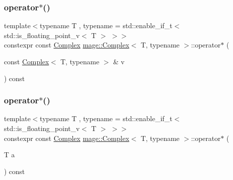 \subsubsection{\texorpdfstring{operator$\ast$()}{operator*()}\hspace{0.1cm}{\footnotesize\ttfamily [1/2]}}
{\footnotesize\ttfamily template$<$typename T , typename  = std\+::enable\+\_\+if\+\_\+t$<$ std\+::is\+\_\+floating\+\_\+point\+\_\+v$<$ T $>$ $>$$>$ \\
constexpr const \mbox{\hyperlink{structmage_1_1_complex}{Complex}} \mbox{\hyperlink{structmage_1_1_complex}{mage\+::\+Complex}}$<$ T, typename $>$\+::operator$\ast$ (\begin{DoxyParamCaption}\item[{const \mbox{\hyperlink{structmage_1_1_complex}{Complex}}$<$ T, typename $>$ \&}]{v }\end{DoxyParamCaption}) const\hspace{0.3cm}{\ttfamily [noexcept]}}

\mbox{\label{structmage_1_1_complex_a2165764efc8953ad4223dbc2c44813e9}} 
\subsubsection{\texorpdfstring{operator$\ast$()}{operator*()}\hspace{0.1cm}{\footnotesize\ttfamily [2/2]}}
{\footnotesize\ttfamily template$<$typename T , typename  = std\+::enable\+\_\+if\+\_\+t$<$ std\+::is\+\_\+floating\+\_\+point\+\_\+v$<$ T $>$ $>$$>$ \\
constexpr const \mbox{\hyperlink{structmage_1_1_complex}{Complex}} \mbox{\hyperlink{structmage_1_1_complex}{mage\+::\+Complex}}$<$ T, typename $>$\+::operator$\ast$ (\begin{DoxyParamCaption}\item[{T}]{a }\end{DoxyParamCaption}) const\hspace{0.3cm}{\ttfamily [noexcept]}}

\mbox{\label{structmage_1_1_complex_a2ba6cc76c8a7461a2dda107374f0fc30}} 
